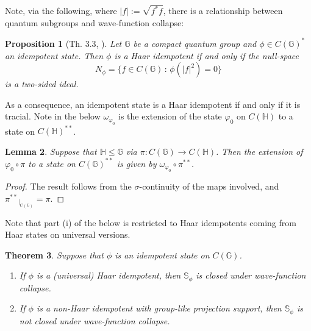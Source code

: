 \documentclass[12pt]{amsart}
\newtheorem{theorem}{Theorem}[section]
\newtheorem{proposition}[theorem]{Proposition}
\newtheorem{lemma}[theorem]{Lemma}
\theoremstyle{remark}
\theoremstyle{remark}
\begin{document}
Note, via the following, where $|f|:=\sqrt{f^*f}$, there is a relationship between  quantum subgroups and wave-function collapse:
\begin{proposition}[Th. 3.3, \cite{fst}]\label{fst3.3}
Let $\mathbb{G}$ be a compact quantum group and $\phi\in C(\mathbb{G})^*$ an idempotent state. Then $\phi$ is a Haar idempotent if and only if the null-space $$N_\phi = \{f\in C(\mathbb{G}) \,:\, \phi(|f|^2)=0\}$$ is a two-sided ideal.
\end{proposition}
As a consequence, an idempotent state is a Haar idempotent if and only if it is tracial. Note in the below  $\omega_{\varphi_0}$ is the extension of the state $\varphi_0$ on $C(\mathbb{H})$ to a state on $C(\mathbb{H})^{**}$.
\begin{lemma}\label{fact}
Suppose that $\mathbb{H}\leq\mathbb{G}$ via $\pi:C(\mathbb{G})\to C(\mathbb{H})$. Then the extension of $\varphi_0\circ \pi$ to a state on $C(\mathbb{G})^{**}$ is given by  $\omega_{\varphi_0}\circ \pi^{**}$.

\end{lemma}
\begin{proof}

The result follows from the $\sigma$-continuity of the maps involved, and ${\pi^{**}}_{\left.\right|_{C(\mathbb{G})}}=\pi$.

\end{proof}
Note that part (i) of the below is restricted to Haar idempotents coming from Haar states on universal versions.
\begin{theorem}\label{wfct}
Suppose that $\phi$ is an idempotent state on $C(\mathbb{G})$.
  \begin{enumerate}
    \item[(i)] If $\phi$ is a (universal) Haar idempotent, then $\mathbb{S}_\phi$ is closed under wave-function collapse.
    \item[(ii)] If $\phi$ is a non-Haar idempotent with group-like projection support, then $\mathbb{S}_\phi$ is not closed under wave-function collapse.
  \end{enumerate}
\end{theorem}
\end{document}
